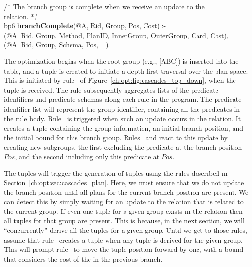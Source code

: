 \begin{figure*}
\begin{boxedminipage}{\linewidth}
/* The branch group is complete when we receive an update to the  \\
    relation. */ \\
bp6 {\bf branchComplete}(@A, Rid, Group, Pos, Cost) :- \\
(@A, Rid, Group, Method, PlanID, InnerGroup, OuterGroup, Card, Cost), \\
(@A, Rid, Group, Schema, Pos, \_). \\
  
\end{boxedminipage}
\caption{\label{ch:opt:fig:cascades_top_down} Cascades top-down search strategy rules.}
\end{figure*}

The optimization begins when the root group (e.g., [ABC]) is inserted into the
 table, and a  tuple is created to initiate a depth-first
traversal over the plan space.  This is initiated by rule~ of
Figure~\ref{ch:opt:fig:cascades_top_down}, when the 
tuple is received.  The rule subsequently aggregates lists of the predicate
identifiers and predicate schemas along each rule in the program.  The
predicate identifier list will represent the group identifier, containing all the
predicates in the rule body.  Rule~ is triggered when such an update occurs
in the  relation.  It creates a  tuple containing the
group information, an initial branch position, and the initial bound for this
branch group.  Rules~ and  react to this  update by
creating new subgroups, the first excluding the predicate at the branch position
$Pos$, and the second including only this predicate at $Pos$.

The  tuples will trigger the generation of  tuples using
the rules described in Section~\ref{ch:opt:sec:cascades_plan}.  Here, we must
ensure that we do not update the branch position until all plans for the
current branch position are present.  We can detect this by simply waiting for
an update to the  relation that is related to the current 
group.  If even one  tuple for a given group exists in the 
relation then all  tuples for that group are present.  This is
because, in the next section, we will ``concurrently'' derive all the 
tuples for a given group.  Until we get to those rules, assume that
rule~ creates a  tuple when any  tuple is
derived for the given group.  This will prompt rule~ to move the
 tuple position forward by one, with a bound that considers the
cost of the  in the previous branch.

